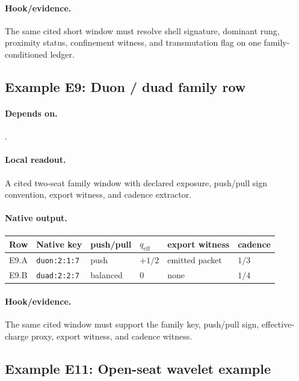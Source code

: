 \paragraph{Hook/evidence.} The same cited short window must resolve shell signature, dominant rung, proximity status, confinement witness, and transmutation flag on one family-conditioned ledger.

\subsection{Example E9: Duon / duad family row}\label{ex:e9}
\paragraph{Depends on.} .
\paragraph{Local readout.} A cited two-seat family window with declared exposure, push/pull sign convention, export witness, and cadence extractor.
\paragraph{Native output.}
{\footnotesize
\begin{center}
\begin{tabular}{@{}llllll@{}}
\toprule
Row & Native key & push/pull & $q_{\mathrm{eff}}$ & export witness & cadence \\
\midrule
E9.A & \texttt{duon:2:1:7} & push & $+1/2$ & emitted packet & $1/3$ \\
E9.B & \texttt{duad:2:2:7} & balanced & $0$ & none & $1/4$ \\
\bottomrule
\end{tabular}
\end{center}}
\paragraph{Hook/evidence.} The same cited window must support the family key, push/pull sign, effective-charge proxy, export witness, and cadence witness.



\subsection{Example E11: Open-seat wavelet example}\label{ex:e11}
